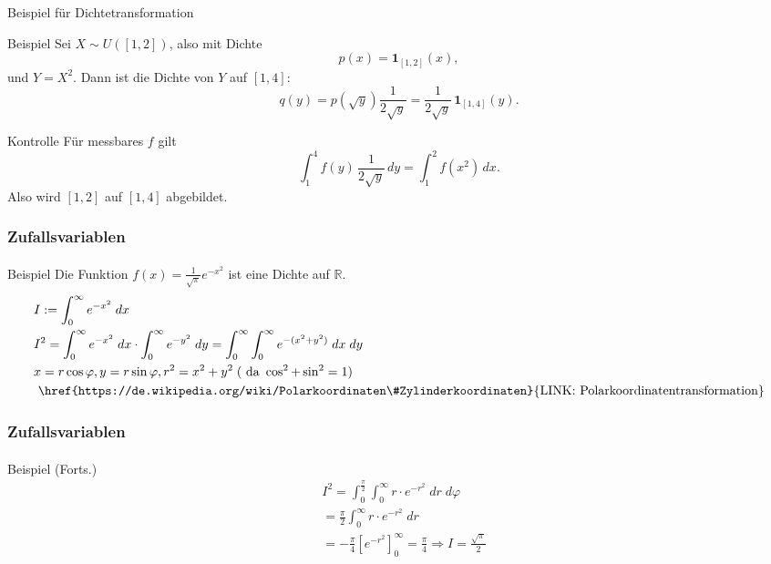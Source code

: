 \documentclass{beamer}
\begin{document}
\begin{frame}{Beispiel für Dichtetransformation}
\begin{block}{Beispiel}
Sei \(X\sim U([1,2])\), also mit Dichte
\[
p(x)=\mathbf 1_{[1,2]}(x),
\]
und \(Y=X^2\).
Dann ist die Dichte von \(Y\) auf \([1,4]\):
\[
q(y)=p(\sqrt y)\frac{1}{2\sqrt y}
=
\frac{1}{2\sqrt y}\,\mathbf 1_{[1,4]}(y).
\]
\end{block}

\begin{block}{Kontrolle}
Für messbares \(f\) gilt
\[
\int_1^4 f(y)\,\frac{1}{2\sqrt y}\,dy
=
\int_1^2 f(x^2)\,dx.
\]
Also wird \([1,2]\) auf \([1,4]\) abgebildet.
\end{block}
\end{frame}


\begin{frame}
    \frametitle{Zufallsvariablen}
\framesubtitle{}
\begin{block}{Beispiel}
Die Funktion $f(x) = \frac{1}{\sqrt{\pi}} e^{- x^2}$ ist eine Dichte auf $ \mathbb{R}$.
\begin{align*}
& I := \int_{0}^{\infty} e^{-x^2} \; dx\\
& I^2 =  \int_{0}^{\infty} e^{-x^2} \; dx \cdot    \int_{0}^{\infty} e^{-y^2} \; dy =    \int_{0}^{\infty} \int_{0}^{\infty} e^{-(x^2+y^2)} \; dx \;dy \\
&x=r \cos \varphi ,y=r\sin \varphi ,r^2 = x^2 + y^2  \; (\text{ da } \cos^2 + \sin^2 = 1)\\
 &\text{ \href{https://de.wikipedia.org/wiki/Polarkoordinaten\#Zylinderkoordinaten}{LINK: Polarkoordinatentransformation}}
\end{align*}
\end{block}
 \end{frame}

 \begin{frame}
    \frametitle{Zufallsvariablen}
\framesubtitle{}
\begin{block}{Beispiel (Forts.)}
\begin{align*}
& I^2 = \int_{0}^{\frac{\pi}{2}}  \int_{0}^{\infty}r \cdot e^{-r^2} \; dr \;d\varphi \\
&= \frac{\pi}{2} \int_{0}^{\infty}r \cdot e^{-r^2} \; dr \\
&= -\frac{\pi}{4} [e^{-r^2} ]_0^{\infty} = \frac{\pi}{4} \Rightarrow I = \frac{\sqrt{\pi}}{2}
\end{align*}
\end{block}
 \end{frame}
 
\end{document}
